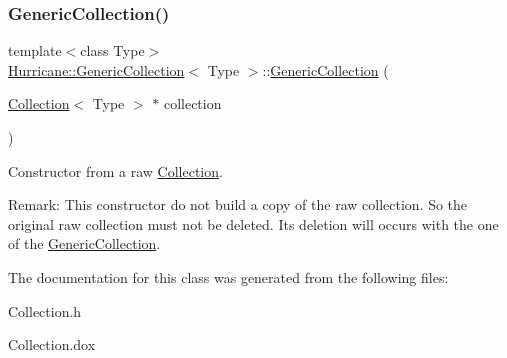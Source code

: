 \subsubsection{\texorpdfstring{Generic\+Collection()}{GenericCollection()}\hspace{0.1cm}{\footnotesize\ttfamily [3/3]}}
{\footnotesize\ttfamily template$<$class Type$>$ \\
\hyperlink{classHurricane_1_1GenericCollection}{Hurricane\+::\+Generic\+Collection}$<$ Type $>$\+::\hyperlink{classHurricane_1_1GenericCollection}{Generic\+Collection} (\begin{DoxyParamCaption}\item[{\hyperlink{classHurricane_1_1Collection}{Collection}$<$ Type $>$ $\ast$}]{collection }\end{DoxyParamCaption})\hspace{0.3cm}{\ttfamily [inline]}}

Constructor from a raw \hyperlink{classHurricane_1_1Collection}{Collection}.

\begin{DoxyParagraph}{Remark\+:}
This constructor do not build a copy of the raw collection. So the original raw collection must not be deleted. It\textquotesingle{}s deletion will occurs with the one of the \hyperlink{classHurricane_1_1GenericCollection}{Generic\+Collection}. 
\end{DoxyParagraph}


The documentation for this class was generated from the following files\+:\begin{DoxyCompactItemize}
\item 
Collection.\+h\item 
Collection.\+dox\end{DoxyCompactItemize}
